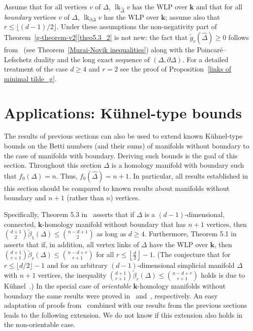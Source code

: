 \documentclass[ALCO,ThmDefs,Unicode,epreuves]{cedram}
\DeclareMathOperator\lk{lk}
\newcommand{\complet}[1]{\hat{#1}}
\newcommand{\field}{\mathbf{k}}
\newcommand{\halffloor}{\left\lfloor \frac{d}{2}\right\rfloor}
\begin{document}
\begin{rema} \label{nonnegativity-not-new}
Assume that for all vertices $v$ of $\Delta$, $\lk_{\complet{\Delta}}v$ has the WLP over $\field$ and that for all \emph{boundary} vertices $v$ of $\Delta$, $\lk_{\partial\Delta}v$ has the WLP over $\field$; assume also that $r\leq \lfloor (d-1)/2\rfloor$. Under these assumptions the non-negativity part of Theorem~\ref{g-theorem-v2}\eqref{theo5.3_2} is not new: the fact that $\tilde{g}_r(\complet{\Delta})\geq 0$ follows from~\cite[Theorem~1.5]{Murai-Novik-bdry} (see Theorem~\ref{Murai-Novik inequalities}) along with the Poincar{\'e}--Lefschetz duality and the long exact sequence of $(\Delta,\partial\Delta)$. For a detailed treatment of the case $d\geq4$ and $r=2$ see the proof of Proposition~\ref{links of minimal tilde_g}.
\end{rema}

\section{Applications: K{\"u}hnel-type bounds}
The results of previous sections can also be used to extend known K{\"u}hnel-type bounds on the Betti numbers (and their sums) of manifolds without boundary to the case of manifolds with boundary. Deriving such bounds is the goal of this section. Throughout this section $\Delta$ is a homology manifold with boundary such that $f_0(\Delta)=n$. Thus, $f_0(\complet{\Delta})=n+1$. In particular, all results established in this section should be compared to known results about manifolds without boundary and $n+1$ (rather than $n$) vertices.

Specifically, Theorem 5.3 in~\cite{Murai-15} asserts that if $\Delta$ is a $(d-1)$-dimensional, connected, $\field$-homology manifold without boundary that has $n+1$ vertices, then $\binom{d+1}{2}\tilde{\beta}_1(\Delta)\leq \binom{n-d+1}{2}$ as long as $d\geq 4$. Furthermore, Theorem 5.1 in~\cite{Murai-15} asserts that if, in addition, all vertex links of $\Delta$ have the WLP over $\field$, then $\binom{d+1}{r+1}\tilde{\beta}_r(\Delta)\leq \binom{n-d+r}{r+1}$ for all $r\leq\halffloor-1$. (The conjecture that for $r\leq \lfloor d/2\rfloor-1$ and for an arbitrary $(d-1)$-dimensional simplicial manifold $\Delta$ with $n+1$ vertices, the inequality $\binom{d+1}{r+1}\tilde{\beta}_r(\Delta)\leq \binom{n-d+r}{r+1}$ holds is due to K{\"u}hnel~\cite[Conjecture~18]{Lutz-05}.) In the special case of \emph{orientable} $\field$-homology manifolds without boundary the same results were proved in~\cite[Theorem~5.2]{Novik-Swartz-09:Socles} and~\cite[Theorem~4.3]{Novik-Swartz-09:DS}, respectively. An easy adaptation of proofs from~\cite{Novik-Swartz-09:Socles,Novik-Swartz-09:DS} combined with our results from the previous sections leads to the following extension. We do not know if this extension also holds in the non-orientable case.
\end{document}
